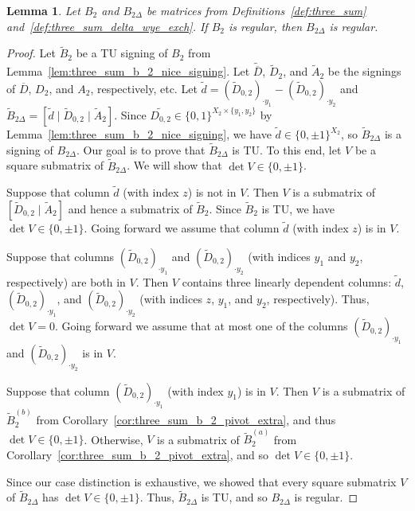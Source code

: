 \documentclass{article}
\newtheorem{lemma}{Lemma}
\theoremstyle{definition}
\begin{document}
\begin{lemma}\label{lem:three_sum_b_2_exch_regular_forward}
    Let $B_{2}$ and $B_{2 \Delta}$ be matrices from Definitions~\ref{def:three_sum} and~\ref{def:three_sum_delta_wye_exch}. If $B_{2}$ is regular, then $B_{2 \Delta}$ is regular.
\end{lemma}

\begin{proof}
    Let $\tilde{B}_{2}$ be a TU signing of $B_{2}$ from Lemma~\ref{lem:three_sum_b_2_nice_signing}. Let $\tilde{\overline{D}}$, $\tilde{D}_{2}$, and $\tilde{A}_{2}$ be the signings of $\overline{D}$, $D_{2}$, and $A_{2}$, respectively, etc. %
    Let $\tilde{d} = (\tilde{D}_{0, 2})_{\cdot y_{1}} - (\tilde{D}_{0, 2})_{\cdot y_{2}}$ and $\tilde{B}_{2 \Delta} = [\tilde{d} \mid \tilde{D}_{0, 2} \mid \tilde{A}_{2}]$. Since $\tilde{D_{0, 2}} \in \{0, 1\}^{X_{2} \times \{y_{1}, y_{2}\}}$ by Lemma~\ref{lem:three_sum_b_2_nice_signing}, we have $\tilde{d} \in \{0, \pm 1\}^{X_{2}}$, so $\tilde{B}_{2 \Delta}$ is a signing of $B_{2 \Delta}$. Our goal is to prove that $\tilde{B}_{2 \Delta}$ is TU. To this end, let $V$ be a square submatrix of $\tilde{B}_{2 \Delta}$. We will show that $\det V \in \{0, \pm 1\}$.

    Suppose that column $\tilde{d}$ (with index $z$) is not in $V$. Then $V$ is a submatrix of $[\tilde{D}_{0, 2} \mid \tilde{A}_{2}]$ and hence a submatrix of $\tilde{B}_{2}$. Since $\tilde{B}_{2}$ is TU, we have $\det V \in \{0, \pm 1\}$. Going forward we assume that column $\tilde{d}$ (with index $z$) is in $V$.

    Suppose that columns $(\tilde{D}_{0, 2})_{\cdot y_{1}}$ and $(\tilde{D}_{0, 2})_{\cdot y_{2}}$ (with indices $y_{1}$ and $y_{2}$, respectively) are both in $V$. Then $V$ contains three linearly dependent columns: $\tilde{d}$, $(\tilde{D}_{0, 2})_{\cdot y_{1}}$, and $(\tilde{D}_{0, 2})_{\cdot y_{2}}$ (with indices $z$, $y_{1}$, and $y_{2}$, respectively). Thus, $\det V = 0$. Going forward we assume that at most one of the columns $(\tilde{D}_{0, 2})_{\cdot y_{1}}$ and $(\tilde{D}_{0, 2})_{\cdot y_{2}}$ is in $V$.

    Suppose that column $(\tilde{D}_{0, 2})_{\cdot y_{1}}$ (with index $y_{1}$) is in $V$. Then $V$ is a submatrix of $\tilde{B}_{2}^{(b)}$ from Corollary~\ref{cor:three_sum_b_2_pivot_extra}, and thus $\det V \in \{0, \pm 1\}$. Otherwise, $V$ is a submatrix of $\tilde{B}_{2}^{(a)}$ from Corollary~\ref{cor:three_sum_b_2_pivot_extra}, and so $\det V \in \{0, \pm 1\}$.

    Since our case distinction is exhaustive, we showed that every square submatrix $V$ of $\tilde{B}_{2 \Delta}$ has $\det V \in \{0, \pm 1\}$. Thus, $\tilde{B}_{2 \Delta}$ is TU, and so $B_{2 \Delta}$ is regular.
\end{proof}
\end{document}

